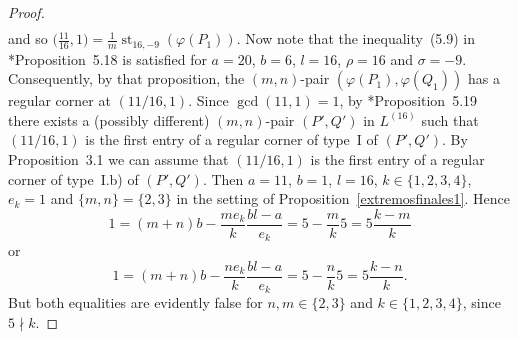 \documentclass[reqno,a4paper,twoside]{amsart}
\theoremstyle{definition}
\theoremstyle{remark}
\DeclareMathOperator{\st}{st}
\begin{document}
\begin{proof}
\begin{align*}
\end{align*}
and so $\bigl(\frac{11}{16},1\bigr) = \frac{1}{m}\st_{16,-9}(\varphi(P_1))$. Now note that the inequality~(5.9) in \cite{GGV1}*{Proposition~5.18} is satisfied for $a=20$, $b=6$, $l=16$, $\rho=16$ and $\sigma=-9$. Consequently, by that proposition, the $(m,n)$-pair $(\varphi(P_1),\varphi(Q_1))$ has a regular corner at $(11/16,1)$. Since $\gcd(11,1) = 1$, by \cite{GGV1}*{Proposition~5.19} there exists a (possibly different) $(m,n)$-pair $(P',Q')$ in $L^{(16)}$ such that $(11/16,1)$ is the first entry of a regular corner of type~I of $(P',Q')$. By Proposition~3.1 we can assume that $(11/16,1)$ is the first entry of a regular corner of type~I.b) of $(P',Q')$. Then $a=11$, $b=1$, $l=16$, $k\in\{1,2,3,4\}$, $e_k=1$ and $\{m,n\}=\{2,3\}$ in the setting of Proposition~\ref{extremosfinales1}. Hence
$$
1=(m+n)b-\frac{me_k}{k} \frac{bl-a}{e_k}=5-\frac{m}{k}5=5\frac{k-m}{k}
$$
or
$$
1=(m+n)b-\frac{ne_k}{k} \frac{bl-a}{e_k}=5-\frac{n}{k}5=5\frac{k-n}{k}.
$$
But both equalities are evidently false for $n,m\in\{2,3\}$ and $k\in\{1,2,3,4\}$, since $5\nmid k$.
\end{proof}
\end{document}
